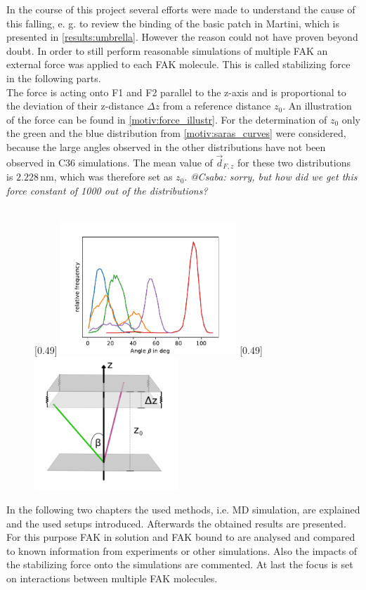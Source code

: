 In the course of this project several efforts were made to understand the cause of this falling, e. g. to review the binding of the basic patch in Martini, which is presented in \autoref{results:umbrella}. However the reason could not have proven beyond doubt. In order to still perform reasonable simulations of multiple FAK an external force was applied to each FAK molecule. This is called stabilizing force in the following parts.\\
The force is acting onto F1 and F2 parallel to the z-axis and is proportional to the deviation of their z-distance $\Delta z$ from a reference distance $z_0$. An illustration of the force can be found in \autoref{motiv:force_illustr}. For the determination of $z_0$ only the green and the blue distribution from \autoref{motiv:saras_curves} were considered, because the large angles observed in the other distributions have not been observed in C36 simulations. The mean value of $\vec{d}_{F, z}$ for these two distributions is $2.228\,\si{\nano\metre}$, which was therefore set as $z_0$. %
\textit{@Csaba: sorry, but how did we get this force constant of 1000 out of the distributions?}\\
\\
%
%
%
\begin{figure}
	[0.49\textwidth]{
		\includegraphics[height=5cm]{figures/introduction/sara_angles}
	}\hfill%
	[0.49\textwidth]{
		\includegraphics[height=5cm]{figures/introduction/forceapproach}
	}%
\end{figure}
%
%
%
In the following two chapters the used methods, i.e. MD simulation, are explained and the used setups introduced. Afterwards the obtained results are presented. For this purpose FAK in solution and FAK bound to \pip{} are analysed and compared to known information from experiments or other simulations. Also the impacts of the stabilizing force onto the simulations are commented. At last the focus is set on interactions between multiple FAK molecules.

